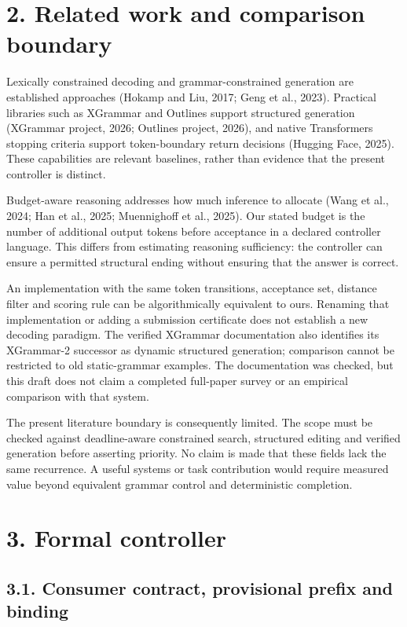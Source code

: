 \documentclass[
  12pt,
  a4paper,
]{article}
\begin{document}
\section{2. Related work and comparison
boundary}\label{related-work-and-comparison-boundary}

Lexically constrained decoding and grammar-constrained generation are
established approaches (Hokamp and Liu, 2017; Geng et al., 2023).
Practical libraries such as XGrammar and Outlines support structured
generation (XGrammar project, 2026; Outlines project, 2026), and native
Transformers stopping criteria support token-boundary return decisions
(Hugging Face, 2025). These capabilities are relevant baselines, rather
than evidence that the present controller is distinct.

Budget-aware reasoning addresses how much inference to allocate (Wang et
al., 2024; Han et al., 2025; Muennighoff et al., 2025). Our stated
budget is the number of additional output tokens before acceptance in a
declared controller language. This differs from estimating reasoning
sufficiency: the controller can ensure a permitted structural ending
without ensuring that the answer is correct.

An implementation with the same token transitions, acceptance set,
distance filter and scoring rule can be algorithmically equivalent to
ours. Renaming that implementation or adding a submission certificate
does not establish a new decoding paradigm. The verified XGrammar
documentation also identifies its XGrammar-2 successor as dynamic
structured generation; comparison cannot be restricted to old
static-grammar examples. The documentation was checked, but this draft
does not claim a completed full-paper survey or an empirical comparison
with that system.

The present literature boundary is consequently limited. The scope must
be checked against deadline-aware constrained search, structured editing
and verified generation before asserting priority. No claim is made that
these fields lack the same recurrence. A useful systems or task
contribution would require measured value beyond equivalent grammar
control and deterministic completion.

\section{3. Formal controller}\label{formal-controller}

\subsection{3.1. Consumer contract, provisional prefix and
binding}\label{consumer-contract-provisional-prefix-and-binding}
\end{document}
